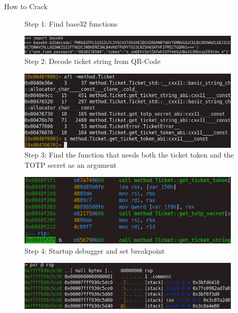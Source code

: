 \documentclass[final,dvipsnames]{beamer}
\newlength{\colwidth}
\begin{document}
\begin{frame}[t, fragile]
\begin{columns}[t]
\begin{column}{\colwidth}
\begin{block}{How to Crack}
\begin{figure}[h]
            \caption{Step 1: Find base32 functions}
            \label{fig:HackingStep1}
        \end{figure}
        \begin{figure}[h]
            \centering
            \includegraphics[width=0.95\textwidth]{figures/Hacking_step_2.png}
            \caption{Step 2: Decode ticket string from QR-Code}
            \label{fig:HackingStep2}
        \end{figure}
        \begin{figure}[h]
            \centering
            \includegraphics[width=0.95\textwidth]{figures/Hacking_step_3.png}
            \caption{Step 3: Find the function that needs both the ticket token and the TOTP secret as an argument}
            \label{fig:HackingStep3}
        \end{figure}
        \begin{figure}[h]
            \centering
            \includegraphics[width=0.95\textwidth]{figures/Hacking_step_4.png}
            \caption{Step 4: Startup debugger and set breakpoint}
            \label{fig:HackingStep4}
        \end{figure}
        \begin{figure}[h]
            \centering
            \includegraphics[width=0.95\textwidth]{figures/Hacking_step_5.png}

\end{figure}
\end{block}
\end{column}
\end{columns}
\end{frame}
\end{document}

